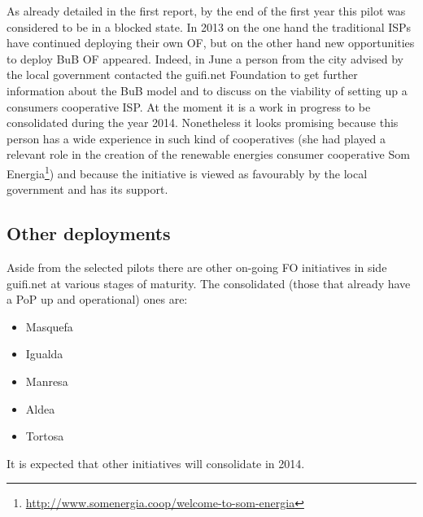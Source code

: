As already detailed in the first report, by the end of the first year this pilot was considered to be in a blocked state. In 2013 on the one hand the traditional ISPs have continued deploying their own OF, but on the other hand new opportunities to deploy BuB OF appeared. Indeed, in June a person from the city advised by the local government contacted the guifi.net Foundation to get further information about the BuB model and to discuss on the viability of setting up a consumers cooperative ISP. At the moment it is a work in progress to be consolidated during the year 2014. Nonetheless it looks promising because this person has a wide experience in such kind of cooperatives (she had played a relevant role in the creation of the renewable energies consumer cooperative Som Energia\footnote{\url{http://www.somenergia.coop/welcome-to-som-energia}}) and because the initiative is viewed as favourably by the local government and has its support.


\FloatBarrier
\subsection{Other deployments}
\label{dep_other}

Aside from the selected pilots there are other on-going FO initiatives in side guifi.net at various stages of maturity. The consolidated (those that already have a PoP up and operational) ones are:

\begin{itemize}
\item Masquefa
\item Igualda
\item Manresa
\item Aldea
\item Tortosa
\end{itemize}

It is expected that other initiatives will consolidate in 2014.
